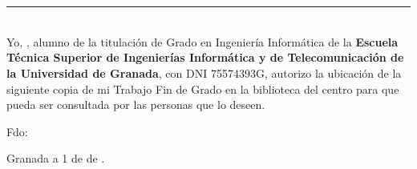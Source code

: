 \chapter*{}
\thispagestyle{empty}

\noindent\rule[-1ex]{\textwidth}{2pt}\\[4.5ex]

Yo, \textbf{\tfgauthorname}, alumno de la titulación de Grado en Ingeniería Informática de la \textbf{Escuela Técnica Superior
de Ingenierías Informática y de Telecomunicación de la Universidad de Granada}, con DNI 75574393G, autorizo la
ubicación de la siguiente copia de mi Trabajo Fin de Grado en la biblioteca del centro para que pueda ser
consultada por las personas que lo deseen.

\vspace{6cm}

\noindent Fdo: \tfgauthorname

\vspace{2cm}

\begin{flushright}
Granada a 1 de \tfgmes{} de \tfganno .
\end{flushright}
